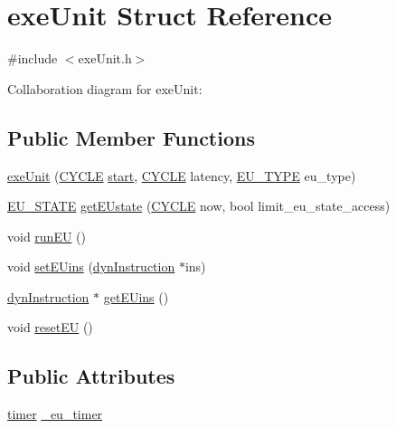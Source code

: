 \hypertarget{structexeUnit}{
\section{exeUnit Struct Reference}
\label{structexeUnit}
}


{\ttfamily \#include $<$exeUnit.h$>$}



Collaboration diagram for exeUnit:
\subsection*{Public Member Functions}
\begin{DoxyCompactItemize}
\item 
\hyperlink{structexeUnit_af9048405bad98db15cdefb05bf7b842c}{exeUnit} (\hyperlink{global_2global_8h_a7e19a550ec11d1ed921deb20c22efb5b}{CYCLE} \hyperlink{bkEnd_8cpp_ada310e7f72b38fadd4b24d80ed3438ee}{start}, \hyperlink{global_2global_8h_a7e19a550ec11d1ed921deb20c22efb5b}{CYCLE} latency, \hyperlink{exeUnit_8h_a8184e36081fa22a84c7488c1eaeb0f5d}{EU\_\-TYPE} eu\_\-type)
\item 
\hyperlink{exeUnit_8h_ac578f59a761f9106ba1a8414e02ab6d8}{EU\_\-STATE} \hyperlink{structexeUnit_a739cfd78a98068a64fb2e807f49c4312}{getEUstate} (\hyperlink{global_2global_8h_a7e19a550ec11d1ed921deb20c22efb5b}{CYCLE} now, bool limit\_\-eu\_\-state\_\-access)
\item 
void \hyperlink{structexeUnit_a69498b2ca8353a14447a5596e768fc55}{runEU} ()
\item 
void \hyperlink{structexeUnit_ad9a4840a6956e01419327ba3123683dd}{setEUins} (\hyperlink{classdynInstruction}{dynInstruction} $\ast$ins)
\item 
\hyperlink{classdynInstruction}{dynInstruction} $\ast$ \hyperlink{structexeUnit_a5414837e2e071fc0180c0326cc33370f}{getEUins} ()
\item 
void \hyperlink{structexeUnit_a31fd51a344347d96c9be688de8e0f97a}{resetEU} ()
\end{DoxyCompactItemize}
\subsection*{Public Attributes}
\begin{DoxyCompactItemize}
\item 
\hyperlink{structtimer}{timer} \hyperlink{structexeUnit_a5dc187ea49bad94bbea24f18232500dd}{\_\-eu\_\-timer}
\end{DoxyCompactItemize}


